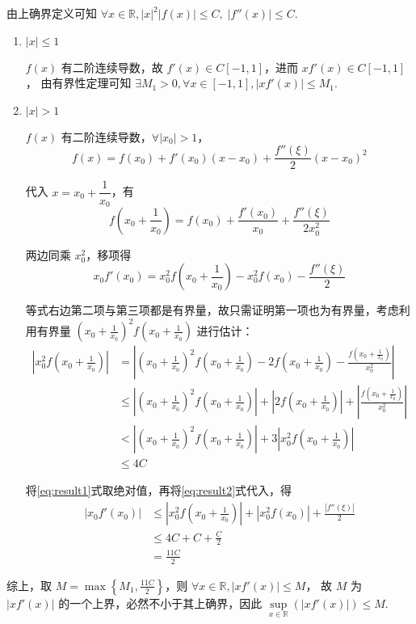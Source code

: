 \documentclass{jhwhw}
\begin{document}
    \solution
        由上确界定义可知 $\forall x \in \mathbb{R}, |x|^2 |f(x)|\leq C, \; |f''(x)|\leq C$.
        \begin{enumerate}
            \item $|x|\leq 1$

                $f(x)$ 有二阶连续导数，故 $f'(x) \in C[-1,1]$，进而 $xf'(x) \in C[-1,1]$，
                由有界性定理可知 $\exists M_1>0, \forall x \in [-1,1], |xf'(x)|\leq M_1$.

            \item $|x|>1$
            
                $f(x)$ 有二阶连续导数，$\forall |x_0|>1$，\begin{equation}
                    f(x) = f(x_0) + f'(x_0)(x-x_0) + \frac{f''(\xi)}{2}(x-x_0)^2
                \end{equation}
                
                代入 $x=x_0+\dfrac{1}{x_0}$，有 \begin{equation}
                    f(x_0+\frac{1}{x_0}) = f(x_0) + \frac{f'(x_0)}{x_0} + \frac{f''(\xi)}{2x_0^2}
                \end{equation}

                两边同乘 $x_0^2$，移项得 \begin{equation}
                    x_0 f'(x_0) = x_0^2 f(x_0+\frac{1}{x_0}) - x_0^2 f(x_0) - \frac{f''(\xi)}{2}  \label{eq:result1}
                \end{equation}

                等式右边第二项与第三项都是有界量，故只需证明第一项也为有界量，考虑利用有界量 $(x_0+\frac{1}{x_0})^2 f(x_0+\frac{1}{x_0})$ 进行估计： \begin{align}
                    \left| x_0^2 f(x_0+\frac{1}{x_0}) \right| &= \left| (x_0+\frac{1}{x_0})^2 f(x_0+\frac{1}{x_0}) - 2f(x_0+\frac{1}{x_0}) - \frac{f(x_0+\frac{1}{x_0})}{x_0^2} \right| \\
                                                              &\leq \left| (x_0+\frac{1}{x_0})^2 f(x_0+\frac{1}{x_0}) \right| + \left| 2f(x_0+\frac{1}{x_0}) \right| + \left| \frac{f(x_0+\frac{1}{x_0})}{x_0^2} \right| \\
                                                              &< \left| (x_0+\frac{1}{x_0})^2 f(x_0+\frac{1}{x_0}) \right| + 3 \left| x_0^2 f(x_0+\frac{1}{x_0}) \right| \\
                                                              &\leq 4C \label{eq:result2}
                \end{align}

            将\eqref{eq:result1}式取绝对值，再将\eqref{eq:result2}式代入，得 \begin{align*}
                \left| x_0 f'(x_0) \right| &\leq \left| x_0^2 f(x_0+\frac{1}{x_0}) \right| + \left| x_0^2 f(x_0) \right| + \frac{\left|f''(\xi)\right|}{2} \\
                                           &\leq 4C + C + \frac{C}{2} \\
                                           &= \frac{11C}{2}
            \end{align*}
        \end{enumerate}

        综上，取 $M=\max\left\{M_1,\frac{11C}{2}\right\}$，则 $\forall x\in \mathbb{R}, |xf'(x)|\leq M$，
        故 $M$ 为 $|xf'(x)|$ 的一个上界，必然不小于其上确界，因此 $\sup\limits_{x \in \mathbb{R}} \left(|xf'(x)|\right) \leq M$.
\end{document}
